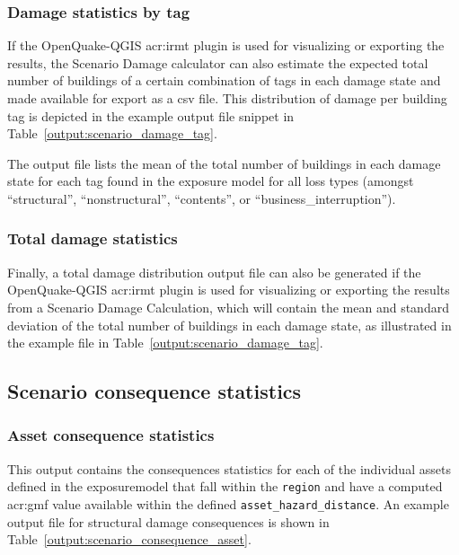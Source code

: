 \subsubsection{Damage statistics by tag}
\label{subsubsec:scenario_tag_damage_statistics}

If the OpenQuake-QGIS \gls{acr:irmt} plugin is used for visualizing or
exporting the results, the Scenario Damage calculator can also estimate the
expected total number of buildings of a certain combination of \glspl{tag} in
each damage state and made available for export as a csv file. This
distribution of damage per building \gls{tag} is depicted in the example
output file snippet in Table~\ref{output:scenario_damage_tag}.



The output file lists the mean of the total number
of buildings in each damage state for each tag found in the
exposure model for all loss types (amongst
``structural'', ``nonstructural'', ``contents'', or
``business\_interruption'').


\subsubsection{Total damage statistics}
\label{subsubsec:scenario_total_damage_statistics}

Finally, a total damage distribution output file can also be generated if the
OpenQuake-QGIS \gls{acr:irmt} plugin is used for visualizing or exporting the
results from a Scenario Damage Calculation, which will contain the mean and
standard deviation of the total number of buildings in each damage state, as
illustrated in the example file in Table~\ref{output:scenario_damage_tag}.




\subsection{Scenario consequence statistics}
\label{subsec:scenario_consequence_statistics}

\subsubsection{Asset consequence statistics}
\label{subsubsec:scenario_asset_consequence_statistics}

This output contains the consequences statistics for each of the individual
\glspl{asset} defined in the \gls{exposuremodel} that fall within the
\Verb+region+ and have a computed \gls{acr:gmf} value available
within the defined \Verb+asset_hazard_distance+. An example output file for
structural damage consequences is shown in
Table~\ref{output:scenario_consequence_asset}.

